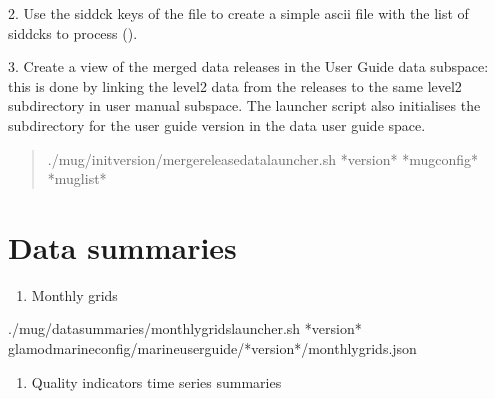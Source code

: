 \documentclass[letterpaper,10pt,english]{sphinxmanual}
\let\sphinxpxdimen\pdfpxdimen\else\newdimen\sphinxpxdimen
\begin{document}
2. Use the sid\sphinxhyphen{}dck keys of the  file to create a simple ascii file  with the list of sid\sphinxhyphen{}dcks to process ().

3. Create a view of the merged data releases in the User Guide data subspace:  this is done by linking the level2 data from the releases to the same level2  subdirectory in user manual subspace. The launcher script also initialises the subdirectory for the user guide version in the data user guide space.
\begin{quote}

\begin{sphinxVerbatim}[commandchars=\\\{\}]
./\PYGZlt{}mug\PYGZgt{}/init\PYGZus{}version/merge\PYGZus{}release\PYGZus{}data\PYGZus{}launcher.sh *version* *mug\PYGZus{}config* *mug\PYGZus{}list*
\end{sphinxVerbatim}

\begin{figure}[htbp]
\centering

\noindent\sphinxincludegraphics[width=300\sphinxpxdimen]{{file_links}.png}
\end{figure}
\end{quote}


\chapter{Data summaries}
\label{\detokenize{index:data-summaries}}\begin{enumerate}
%
\item {} 
Monthly grids

\end{enumerate}

\begin{sphinxVerbatim}[commandchars=\\\{\}]
./\PYGZlt{}mug\PYGZgt{}/data\PYGZus{}summaries/monthly\PYGZus{}grids\PYGZus{}launcher.sh *version* 
\PYGZlt{}glamod\PYGZhy{}marine\PYGZhy{}config\PYGZgt{}/marine\PYGZhy{}user\PYGZhy{}guide/*version*/monthly\PYGZus{}grids.json
\end{sphinxVerbatim}
\begin{enumerate}
%
\setcounter{enumi}{1}
\item {} 
Quality indicators time series summaries

\end{enumerate}



\renewcommand{\indexname}{Index}
\printindex
\end{document}
